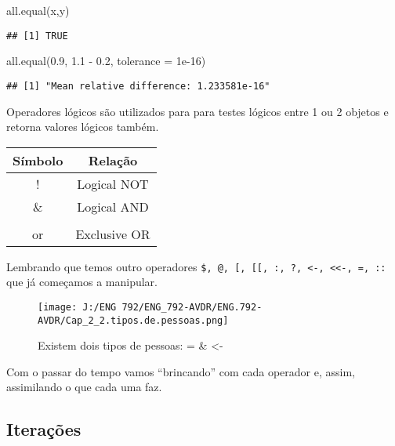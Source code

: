 \documentclass[
]{book}
\newenvironment{Shaded}{\begin{snugshade}}{\end{snugshade}}
\newcommand{\AttributeTok}[1]{\textcolor[rgb]{0.77,0.63,0.00}{#1}}
\newcommand{\FloatTok}[1]{\textcolor[rgb]{0.00,0.00,0.81}{#1}}
\newcommand{\FunctionTok}[1]{\textcolor[rgb]{0.00,0.00,0.00}{#1}}
\newcommand{\NormalTok}[1]{#1}
\newcommand{\SpecialCharTok}[1]{\textcolor[rgb]{0.00,0.00,0.00}{#1}}
\begin{document}
\begin{Shaded}
\begin{Highlighting}[]
\FunctionTok{all.equal}\NormalTok{(x,y)}
\end{Highlighting}
\end{Shaded}

\begin{verbatim}
## [1] TRUE
\end{verbatim}

\begin{Shaded}
\begin{Highlighting}[]
\FunctionTok{all.equal}\NormalTok{(}\FloatTok{0.9}\NormalTok{, }\FloatTok{1.1} \SpecialCharTok{{-}} \FloatTok{0.2}\NormalTok{, }\AttributeTok{tolerance =} \FloatTok{1e{-}16}\NormalTok{)}
\end{Highlighting}
\end{Shaded}

\begin{verbatim}
## [1] "Mean relative difference: 1.233581e-16"
\end{verbatim}

Operadores lógicos são utilizados para para testes lógicos entre 1 ou 2 objetos e retorna valores lógicos também.

\begin{longtable}[]{@{}cc@{}}
\toprule
Símbolo & Relação \\
\midrule
\endhead
! & Logical NOT \\
\& & Logical AND \\
& \\
or & Exclusive OR \\
\bottomrule
\end{longtable}

Lembrando que temos outro operadores \texttt{\$,\ @,\ {[},\ {[}{[},\ :,\ ?,\ \textless{}-,\ \textless{}\textless{}-,\ =,\ ::} que já começamos a manipular.

\begin{figure}
\centering
\texttt{[image: J:/ENG 792/ENG\_792-AVDR/ENG.792-AVDR/Cap\_2\_2.tipos.de.pessoas.png]}
\caption{Existem dois tipos de pessoas: = \& \textless-}
\end{figure}

Com o passar do tempo vamos ``brincando'' com cada operador e, assim, assimilando o que cada uma faz.

\hypertarget{iterauxe7uxf5es}{%
\subsection{Iterações}\label{iterauxe7uxf5es}}
\end{document}
